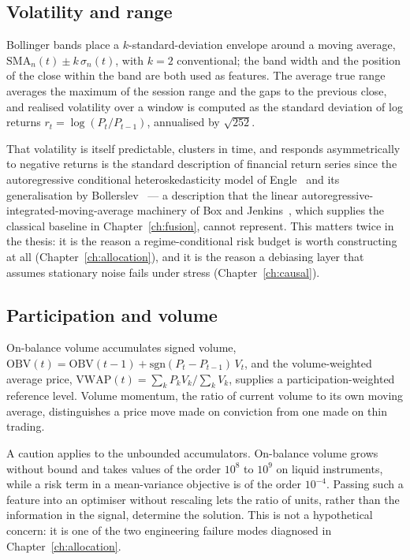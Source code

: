 \subsection{Volatility and range}

Bollinger bands place a $k$-standard-deviation envelope around a moving average,
$\mathrm{SMA}_n(t) \pm k\,\sigma_n(t)$, with $k=2$ conventional; the band width and the
position of the close within the band are both used as features. The average true range
averages the maximum of the session range and the gaps to the previous close, and realised
volatility over a window is computed as the standard deviation of log returns
$r_t = \log(P_t / P_{t-1})$, annualised by $\sqrt{252}$.

That volatility is itself predictable, clusters in time, and responds asymmetrically to negative
returns is the standard description of financial return series since the autoregressive
conditional heteroskedasticity model of Engle~\cite{engle1982} and its generalisation by
Bollerslev~\cite{bollerslev1986} --- a description that the linear
autoregressive-integrated-moving-average machinery of Box and Jenkins~\cite{boxjenkins1970},
which supplies the classical baseline in Chapter~\ref{ch:fusion}, cannot represent. This matters
twice in the thesis: it is the reason a regime-conditional risk budget is worth constructing at
all (Chapter~\ref{ch:allocation}), and it is the reason a debiasing layer that assumes stationary
noise fails under stress (Chapter~\ref{ch:causal}).

\subsection{Participation and volume}

On-balance volume accumulates signed volume,
$\mathrm{OBV}(t) = \mathrm{OBV}(t-1) + \mathrm{sgn}(P_t - P_{t-1})\,V_t$, and the
volume-weighted average price,
$\mathrm{VWAP}(t) = \sum_k P_k V_k / \sum_k V_k$, supplies a participation-weighted reference
level. Volume momentum, the ratio of current volume to its own moving average, distinguishes a
price move made on conviction from one made on thin trading.

A caution applies to the unbounded accumulators. On-balance volume grows without bound and
takes values of the order $10^{8}$ to $10^{9}$ on liquid instruments, while a risk term in a
mean-variance objective is of the order $10^{-4}$. Passing such a feature into an optimiser
without rescaling lets the ratio of units, rather than the information in the signal, determine
the solution. This is not a hypothetical concern: it is one of the two engineering failure
modes diagnosed in Chapter~\ref{ch:allocation}.

